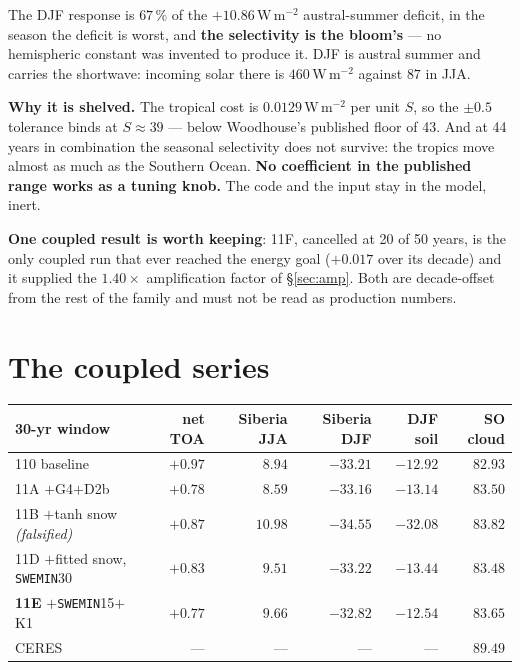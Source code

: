 \documentclass[10pt]{article}
\begin{document}
\noindent The DJF response is $67\,\%$ of the $+10.86$\,W\,m$^{-2}$ austral-summer deficit,
in the season the deficit is worst, and \textbf{the selectivity is the bloom's} --- no
hemispheric constant was invented to produce it. DJF is austral summer and carries the
shortwave: incoming solar there is $460$\,W\,m$^{-2}$ against $87$ in JJA.

\textbf{Why it is shelved.} The tropical cost is $0.0129$\,W\,m$^{-2}$ per unit $S$, so the
$\pm0.5$ tolerance binds at $S\approx39$ --- below Woodhouse's published floor of 43. And
at 44 years in combination the seasonal selectivity does not survive: the tropics move
almost as much as the Southern Ocean. \textbf{No coefficient in the published range works
as a tuning knob.} The code and the input stay in the model, inert.

\textbf{One coupled result is worth keeping}: 11F, cancelled at 20 of 50 years, is the only
coupled run that ever reached the energy goal ($+0.017$ over its decade) and it supplied
the $1.40\times$ amplification factor of \S\ref{sec:amp}. Both are decade-offset from the
rest of the family and must not be read as production numbers.

\section{The coupled series}\label{sec:coupled}

\begin{center}\footnotesize
\begin{tabular}{l r r r r r}
\toprule
30-yr window & net TOA & Siberia JJA & Siberia DJF & DJF soil & SO cloud \\
\midrule
110 baseline & $+0.97$ & $8.94$ & $-33.21$ & $-12.92$ & $82.93$ \\
11A $+$G4$+$D2b & $+0.78$ & $8.59$ & $-33.16$ & $-13.14$ & $83.50$ \\
11B $+$tanh snow \emph{(falsified)} & $+0.87$ & $10.98$ & $-34.55$ & $\mathbf{-32.08}$ & $83.82$ \\
11D $+$fitted snow, \texttt{SWEMIN}30 & $+0.83$ & $9.51$ & $-33.22$ & $-13.44$ & $83.48$ \\
\textbf{11E} $+$\texttt{SWEMIN}15$+$K1 & $\mathbf{+0.77}$ & $9.66$ & $-32.82$ & $\mathbf{-12.54}$ & $83.65$ \\
CERES & --- & --- & --- & --- & $89.49$ \\
\bottomrule
\end{tabular}
\end{center}
\end{document}
